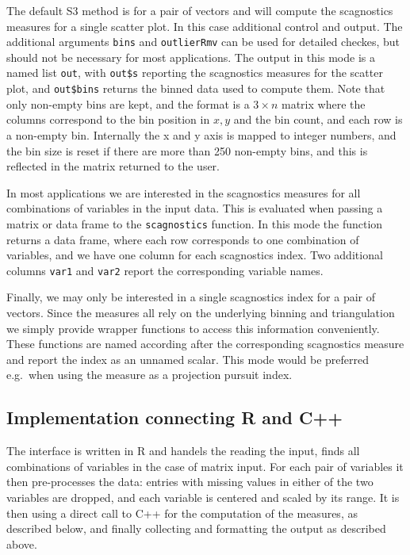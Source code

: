 The default S3 method is for a pair of vectors and will compute the
scagnostics measures for a single scatter plot. In this case additional
control and output. The additional arguments \texttt{bins} and
\texttt{outlierRmv} can be used for detailed checkes, but should not be
necessary for most applications. The output in this mode is a named list
\texttt{out}, with \texttt{out\$s} reporting the scagnostics measures
for the scatter plot, and \texttt{out\$bins} returns the binned data
used to compute them. Note that only non-empty bins are kept, and the
format is a \(3\times n\) matrix where the columns correspond to the bin
position in \(x, y\) and the bin count, and each row is a non-empty bin.
Internally the x and y axis is mapped to integer numbers, and the bin
size is reset if there are more than 250 non-empty bins, and this is
reflected in the matrix returned to the user.

In most applications we are interested in the scagnostics measures for
all combinations of variables in the input data. This is evaluated when
passing a matrix or data frame to the \texttt{scagnostics} function. In
this mode the function returns a data frame, where each row corresponds
to one combination of variables, and we have one column for each
scagnostics index. Two additional columns \texttt{var1} and
\texttt{var2} report the corresponding variable names.

Finally, we may only be interested in a single scagnostics index for a
pair of vectors. Since the measures all rely on the underlying binning
and triangulation we simply provide wrapper functions to access this
information conveniently. These functions are named according after the
corresponding scagnostics measure and report the index as an unnamed
scalar. This mode would be preferred e.g.~when using the measure as a
projection pursuit index.

\hypertarget{implementation-connecting-r-and-c}{%
\subsection{Implementation connecting R and
C++}\label{implementation-connecting-r-and-c}}

The interface is written in R and handels the reading the input, finds
all combinations of variables in the case of matrix input. For each pair
of variables it then pre-processes the data: entries with missing values
in either of the two variables are dropped, and each variable is
centered and scaled by its range. It is then using a direct call to C++
for the computation of the measures, as described below, and finally
collecting and formatting the output as described above.

